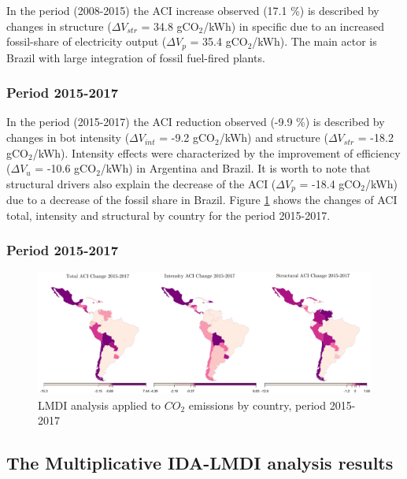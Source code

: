 \documentclass[energies,article,accept,moreauthors,12pt,a4paper]{mdpi} %
\begin{document}
In the period (2008-2015) the ACI increase observed (17.1 \%) is described by changes in structure ($\Delta V_{str}$ = 34.8 gCO$_2$/kWh) in specific due to an increased fossil-share of electricity output ($\Delta V_{p}$ = 35.4 gCO$_2$/kWh). The main actor is Brazil with large integration
of  fossil fuel-fired plants.

\subsubsection{Period 2015-2017}

In the period (2015-2017) the ACI reduction observed (-9.9 \%) is described by changes in bot intensity ($\Delta V_{int}$ = -9.2 gCO$_2$/kWh) and structure ($\Delta V_{str}$ = -18.2 gCO$_2$/kWh). Intensity effects were characterized by the improvement of efficiency ($\Delta V_{u}$ = -10.6 gCO$_2$/kWh) in Argentina and Brazil. It is worth to note that structural drivers also explain the decrease of the ACI ($\Delta V_{p}$ = -18.4 gCO$_2$/kWh) due to a decrease of the fossil share in Brazil. Figure \ref{countriesPlots} shows the changes of ACI total, intensity and structural by country for the period 2015-2017.  

\subsubsection{Period 2015-2017}
        \begin{figure}[H]
	\begin{center} 
		\includegraphics[width=15.6cm]{images/Rplot_1517.pdf}
		\caption{LMDI analysis applied to  $CO_2$ emissions by country, period 2015-2017} 
		\label{countriesPlots}
	\end{center} 
\end{figure}

\subsection{The Multiplicative IDA-LMDI analysis results}
\end{document}
